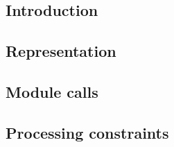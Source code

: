 \subsection{Introduction}                    \label{block hash: processing: introduction}             
\subsection{Representation}                  \label{block hash: processing: representation}           
\subsection{Module calls}                    \label{block hash: processing: module calls}             
\subsection{Processing constraints}          \label{block hash: processing: processing constraints}   
